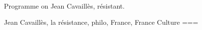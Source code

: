 Programme on Jean Cavaillès, résistant.

Jean Cavaillès, la résistance, philo, France, France Culture
===
\nocite{aglan2024}